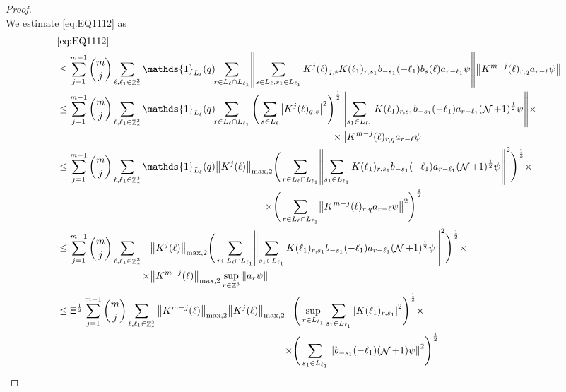 \documentclass[sn-mathphys, Numbered ,a4paper]{sn-jnl}%
\DeclareMathOperator{\Z}{\mathbb{Z}}
\DeclareMathOperator{\NN}{\mathcal{N}}
\newcommand{\half}{\frac{1}{2}}
\theoremstyle{plain}
\theoremstyle{definition}
\theoremstyle{remark}
\theoremstyle{plain}
\theoremstyle{definition}
\theoremstyle{remark}
\begin{document}
\begin{proof}
\begin{equation}
\end{equation}
We estimate \eqref{eq:EQ1112} as 
\begin{alignat}{2}
	&\eqref{eq:EQ1112}\nonumber\\
	&\leq \sum\limits_{j=1}^{m-1} {{m}\choose j} \sum\limits_{\ell, \ell_1\in \Z^3_*} \mathds{1}_{L_{\ell}}(q)\!\! \sum\limits_{r\in L_{\ell} \cap L_{\ell_1}}\! \norm{ \sum\limits_{s \in L_\ell, s_1 \in L_{\ell_1}} K^{j}(\ell)_{q,s} K(\ell_1)_{r,s_1} b_{-s_1}(-\ell_1) b_{s}(\ell) a_{r-\ell_1}\psi}\norm{  K^{m-j}(\ell)_{r,q} a_{r-\ell} \psi } \nonumber\\
	&\leq \sum\limits_{j=1}^{m-1} {{m}\choose j} \sum\limits_{\ell, \ell_1\in \Z^3_*} \mathds{1}_{L_{\ell}}(q)\!\! \sum\limits_{r\in L_{\ell} \cap L_{\ell_1}}\! \begin{aligned}[t]\Bigg( \sum\limits_{s \in L_\ell}\abs{K^{j}(\ell)_{q,s}}^2\Bigg)^\half &\norm{ \sum\limits_{ s_1 \in L_{\ell_1}}  K(\ell_1)_{r,s_1} b_{-s_1}(-\ell_1)  a_{r-\ell_1}(\NN+1)^\half\psi}\times \nonumber\\ \times&\norm{  K^{m-j}(\ell)_{r,q} a_{r-\ell} \psi } \end{aligned} \nonumber\\
	&\leq \sum\limits_{j=1}^{m-1} {{m}\choose j} \sum\limits_{\ell, \ell_1\in \Z^3_*} \begin{aligned}[t] \mathds{1}_{L_{\ell}}(q) \norm{K^{j}(\ell)}_{\mathrm{max,2}} &\Bigg( \sum\limits_{r\in L_{\ell} \cap L_{\ell_1}}\! \norm{ \sum\limits_{ s_1 \in L_{\ell_1}}  K(\ell_1)_{r,s_1} b_{-s_1}(-\ell_1)  a_{r-\ell_1}(\NN+1)^\half\psi} ^2\Bigg)^\half \times\nonumber\\ \quad\times&\Bigg( \sum\limits_{r\in L_{\ell} \cap L_{\ell_1}}\!\norm{  K^{m-j}(\ell)_{r,q} a_{r-\ell} \psi }^2\Bigg)^\half \end{aligned}\nonumber\\
	&\leq \sum\limits_{j=1}^{m-1} {{m}\choose j} \sum\limits_{\ell, \ell_1\in \Z^3_*} \begin{aligned}[t] &\norm{K^{j}(\ell)}_{\mathrm{max,2}}  \Bigg( \sum\limits_{r\in L_{\ell} \cap L_{\ell_1}}\! \norm{ \sum\limits_{ s_1 \in L_{\ell_1}}  K(\ell_1)_{r,s_1} b_{-s_1}(-\ell_1)  a_{r-\ell_1} (\NN+1)^\half \psi} ^2\Bigg)^\half \times \nonumber\\ \times & \norm{K^{m-j}(\ell)}_{\mathrm{max,2}} \sup_{r \in \Z^3}\norm{a_r\psi}\end{aligned} \nonumber\\
	&\leq \Xi^\half \sum\limits_{j=1}^{m-1} {{m}\choose j} \sum\limits_{\ell, \ell_1\in \Z^3_*} \norm{K^{m-j}(\ell)}_{\mathrm{max,2}} \norm{K^{j}(\ell)}_{\mathrm{max,2}} \begin{aligned}[t]&\Bigg(\sup_{r \in L_{\ell_1}} \sum\limits_{ s_1 \in L_{\ell_1}}\abs{  K(\ell_1)_{r,s_1} }^2\Bigg)^\half \times \nonumber \\ \times &\Bigg(  \sum\limits_{ s_1 \in L_{\ell_1}}\norm{   b_{-s_1}(-\ell_1)  (\NN+1)\psi} ^2\Bigg)^\half \end{aligned}\nonumber\\

\end{alignat}
\end{proof}
\end{document}
